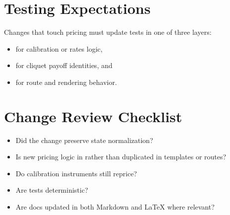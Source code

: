 \documentclass[11pt]{article}
\begin{document}
\section{Testing Expectations}
Changes that touch pricing must update tests in one of three layers:
\begin{itemize}[leftmargin=1.5em]
    \item {} for calibration or rates logic,
    \item {} for cliquet payoff identities, and
    \item {} for route and rendering behavior.
\end{itemize}

\section{Change Review Checklist}
\begin{itemize}[leftmargin=1.5em]
    \item Did the change preserve state normalization?
    \item Is new pricing logic in  rather than duplicated in templates or routes?
    \item Do calibration instruments still reprice?
    \item Are tests deterministic?
    \item Are docs updated in both Markdown and LaTeX where relevant?
\end{itemize}
\end{document}
